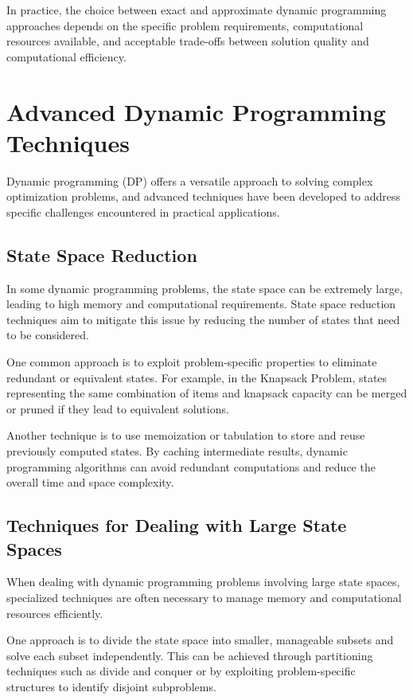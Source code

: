 \documentclass[12pt]{book} %
\begin{document}
In practice, the choice between exact and approximate dynamic programming approaches depends on the specific problem requirements, computational resources available, and acceptable trade-offs between solution quality and computational efficiency.


\section{Advanced Dynamic Programming Techniques}

Dynamic programming (DP) offers a versatile approach to solving complex optimization problems, and advanced techniques have been developed to address specific challenges encountered in practical applications.

\subsection{State Space Reduction}

In some dynamic programming problems, the state space can be extremely large, leading to high memory and computational requirements. State space reduction techniques aim to mitigate this issue by reducing the number of states that need to be considered.

One common approach is to exploit problem-specific properties to eliminate redundant or equivalent states. For example, in the Knapsack Problem, states representing the same combination of items and knapsack capacity can be merged or pruned if they lead to equivalent solutions.

Another technique is to use memoization or tabulation to store and reuse previously computed states. By caching intermediate results, dynamic programming algorithms can avoid redundant computations and reduce the overall time and space complexity.

\subsection{Techniques for Dealing with Large State Spaces}

When dealing with dynamic programming problems involving large state spaces, specialized techniques are often necessary to manage memory and computational resources efficiently.

One approach is to divide the state space into smaller, manageable subsets and solve each subset independently. This can be achieved through partitioning techniques such as divide and conquer or by exploiting problem-specific structures to identify disjoint subproblems.
\end{document}
